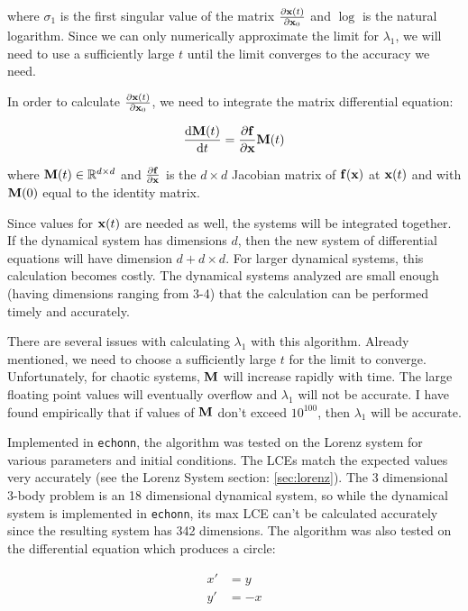 \documentclass{article}
\newcommand{\echonn}{\texttt{echonn}}
\newcommand{\der}[2][t]{\frac{\mathrm{d}#2}{\mathrm{d}#1}}
\begin{document}
where $\sigma_1$ is the first singular value of the matrix $\frac{\partial
\mathbf{x}(t)}{\partial \mathbf{x}_0}$ and $\log$ is the natural logarithm. Since we can
only numerically approximate the limit for $\lambda_1$, we will need to use a
sufficiently large $t$ until the limit converges to the accuracy we need.

In order to calculate $\frac{\partial \mathbf{x}(t)}{\partial \mathbf{x}_0}$, we need to
integrate the matrix differential equation:

\begin{equation}
    \der{\Mv(t)} = \frac{\partial \fv}{\partial \xv} \Mv(t)
    \label{eq:lce_mat_diffeq}
\end{equation}

where $\mathbf{M}(t) \in \mathbb{R}^{d \times d}$ and
$\frac{\partial \mathbf{f}}{\partial \mathbf{x}}$
is the $d \times d$ Jacobian matrix of $\mathbf{f}(\mathbf{x})$ at $\mathbf{x}(t)$ and with 
$\mathbf{M}(0)$ equal to the identity matrix.

Since values for $\mathbf{x}(t)$ are needed as well, the systems will be integrated
together. If the dynamical system has dimensions $d$, then the new system of
differential equations will have dimension $d + d \times d$. For larger
dynamical systems, this calculation becomes costly. The dynamical systems
analyzed are small enough (having dimensions ranging from 3-4) that the
calculation can be performed timely and accurately.

There are several issues with calculating $\lambda_1$ with this algorithm.
Already mentioned, we need to choose a sufficiently large $t$ for the limit
to converge. Unfortunately, for chaotic systems, $\mathbf{M}$ will increase rapidly
with time. The large floating point values will eventually overflow and
$\lambda_1$ will not be accurate. I have found empirically that if values of
$\mathbf{M}$ don't exceed $10^{100}$, then $\lambda_1$ will be accurate.

Implemented in \echonn, the algorithm was tested on the Lorenz system for
various parameters and initial conditions. The LCEs match the expected values
very accurately (see the Lorenz System section: \ref{sec:lorenz}). The 3
dimensional 3-body problem is an 18 dimensional dynamical system, so while
the dynamical system is implemented in \echonn, its max LCE can't be
calculated accurately since the resulting system has 342 dimensions. The
algorithm was also tested on the differential equation which produces a
circle:

\begin{align*}
    x' &= y \\
    y' &= -x
\end{align*}
\end{document}
